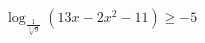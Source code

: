 \begin{ex}[type=inequality]
	\begin{condition}
		\( \log_{\frac{1}{\sqrt[5]{9}}} (13x-2x^2-11)\ge-5 \)
	\end{condition}
	\answer{\( (1;2,5]\cup[4;5,5) \)}
\end{ex}